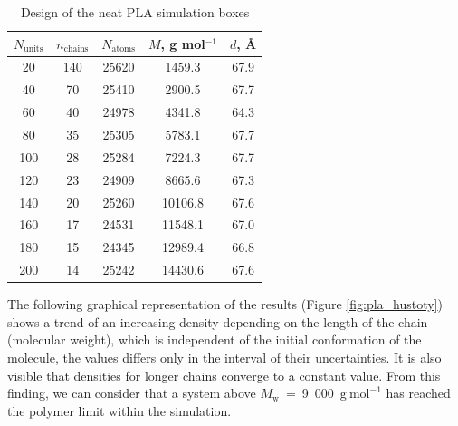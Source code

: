 \begin{table}[h]
	\centering
	\caption{Design of the neat PLA simulation boxes}
	\label{tab:pla_chains}
	\begin{tabular}{ccccc}
		\toprule
		\textbf{\boldmath$N_{\text{units}}$} & \textbf{\boldmath$n_{\text{chains}}$} & \textbf{\boldmath$N_{\text{atoms}}$} & \textbf{\boldmath$M$, g mol$^{-1}$} & \textbf{\boldmath$d$, \AA} \\
		\midrule
		20 & 140 & 25620 & 1459.3 & 67.9 \\
		40 & 70 & 25410 & 2900.5 & 67.7 \\
		60 & 40 & 24978 & 4341.8 & 64.3 \\
		80 & 35 & 25305 & 5783.1 & 67.7 \\
		100 & 28 & 25284 & 7224.3 & 67.7 \\
		120 & 23 & 24909 & 8665.6 & 67.3 \\
		140 & 20 & 25260 & 10106.8 & 67.6 \\
		160 & 17 & 24531 & 11548.1 & 67.0 \\
		180 & 15 & 24345 & 12989.4 & 66.8 \\
		200 & 14 & 25242 & 14430.6 & 67.6 \\
		\bottomrule
	\end{tabular}
	\vspace{-0.5cm}
\end{table}

The following graphical representation of the results (Figure \ref{fig:pla_hustoty}) shows a trend of an increasing density depending on the length of the chain (molecular weight), which is independent of the initial conformation of the molecule, the values differs only in the interval of their uncertainties. It is also visible that densities for longer chains converge to a constant value. From this finding, we can consider that a system above $M_\mathrm{w}$~=~9~000~$\mathrm{g \ mol^{-1}}$ has reached the polymer limit within the simulation.

